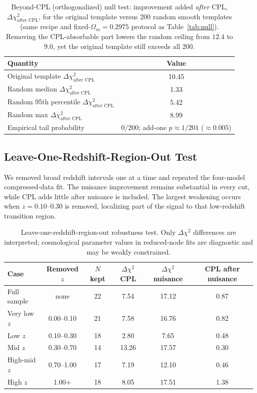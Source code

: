 \documentclass[11pt]{article}
\begin{document}
\begin{table}[h]
\centering
\caption{Beyond-CPL (orthogonalized) null test: improvement added \emph{after} CPL,
$\Delta\chi^2_{\text{after CPL}}$, for the original template versus 200 random smooth
templates (same recipe and fixed-$\Omega_m=0.2975$ protocol as Table~\ref{tab:null}).
Removing the CPL-absorbable part lowers the random ceiling from $12.4$ to $9.0$, yet
the original template still exceeds all 200.}
\label{tab:nullaftercpl}
\begin{tabular}{lc}
\toprule
Quantity & Value \\
\midrule
Original template $\Delta\chi^2_{\text{after CPL}}$ & 10.45 \\
Random median $\Delta\chi^2_{\text{after CPL}}$ & 1.33 \\
Random 95th percentile $\Delta\chi^2_{\text{after CPL}}$ & 5.42 \\
Random max $\Delta\chi^2_{\text{after CPL}}$ & 8.99 \\
Empirical tail probability & 0/200; add-one $p\approx1/201$ ($\approx0.005$) \\
\bottomrule
\end{tabular}
\end{table}

\subsection{Leave-One-Redshift-Region-Out Test}

We removed broad redshift intervals one at a time and repeated the four-model
compressed-data fit. The nuisance improvement remains substantial in every cut, while
CPL adds little after nuisance is included. The largest weakening occurs when
$z=0.10$--$0.30$ is removed, localizing part of the signal to that low-redshift
transition region.

\begin{table}[h]
\centering
\caption{Leave-one-redshift-region-out robustness test. Only $\Delta\chi^2$ differences
are interpreted; cosmological parameter values in reduced-node fits are diagnostic and
may be weakly constrained.}
\label{tab:loo}
\begin{tabular}{lccccc}
\toprule
Case & Removed $z$ & $N$ kept & $\Delta\chi^2$ CPL & $\Delta\chi^2$ nuisance & CPL after nuisance \\
\midrule
Full sample   & none        & 22 & 7.54  & 17.12 & 0.87 \\
Very low $z$  & 0.00--0.10  & 21 & 7.58  & 16.76 & 0.82 \\
Low $z$       & 0.10--0.30  & 18 & 2.80  & 7.65  & 0.48 \\
Mid $z$       & 0.30--0.70  & 14 & 13.26 & 17.57 & 0.30 \\
High-mid $z$  & 0.70--1.00  & 17 & 7.19  & 12.10 & 0.46 \\
High $z$      & 1.00$+$     & 18 & 8.05  & 17.51 & 1.38 \\
\bottomrule
\end{tabular}
\end{table}
\end{document}
